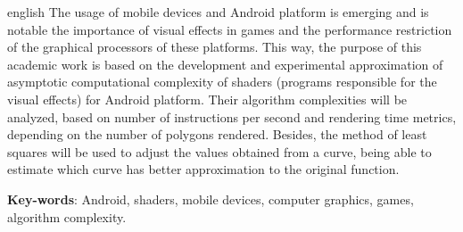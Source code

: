 \begin{resumo}[Abstract]
 \begin{otherlanguage*}{english}
  	The usage of mobile devices and Android platform is emerging and is notable the importance of visual effects in games and the performance restriction of the graphical processors of these platforms. This way, the purpose of this academic work is based on the development and  experimental approximation of asymptotic computational complexity of shaders (programs responsible for the visual effects) for Android platform. Their algorithm complexities will be analyzed, based on number of instructions per second and rendering time metrics, depending on the number of polygons rendered. Besides, the method of least squares will be used to adjust the values obtained from a curve, being able to estimate which curve has better approximation to the original function.  

   \vspace{\onelineskip}
 
   \noindent 
   \textbf{Key-words}: Android, shaders, mobile devices, computer graphics, games, algorithm complexity. 
 \end{otherlanguage*}
\end{resumo}
